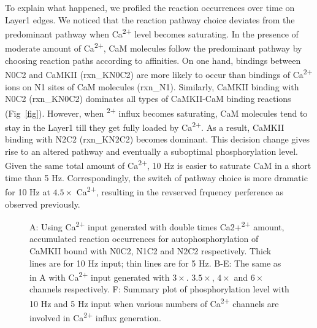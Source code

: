 \documentclass[10pt,letterpaper]{article}
\begin{document}
To explain what happened, we profiled the reaction occurrences over time on Layer1 edges. We noticed that the reaction pathway choice deviates from the predominant pathway when Ca\textsuperscript{2+} level becomes saturating. In the presence of moderate amount of Ca\textsuperscript{2+}, CaM molecules follow the predominant pathway by choosing reaction paths according to affinities. On one hand, bindings between N0C2 and CaMKII (rxn_KN0C2) are more likely to occur than bindings of Ca\textsuperscript{2+} ions on N1 sites of CaM molecules (rxn_N1). Similarly, CaMKII binding with N0C2 (rxn_KN0C2) dominates all types of CaMKII-CaM binding reactions (Fig~\ref{fig}). However, when \textsuperscript{2+} influx becomes saturating, CaM molecules tend to stay in the Layer1 till they get fully loaded by Ca\textsuperscript{2+}. As a result, CaMKII binding with N2C2 (rxn_KN2C2) becomes dominant. This decision change gives rise to an altered pathway and eventually a suboptimal phosphorylation level. Given the same total amount of Ca\textsuperscript{2+}, 10 Hz is easier to saturate CaM in a short time than 5 Hz. Correspondingly, the switch of pathway choice is more dramatic for 10 Hz at $4.5\times$ Ca\textsuperscript{2+}, resulting in the revserved frquency perference as observed previously.

\begin{figure}[!h]
	\caption{{\bf}
	A: Using Ca\textsuperscript{2+} input generated with double times Ca2+\textsuperscript{2+} amount, accumulated reaction occurrences for autophosphorylation of CaMKII bound with N0C2, N1C2 and N2C2 respectively. Thick lines are for 10 Hz input; thin lines are for 5 Hz. B-E: The same as in A with Ca\textsuperscript{2+} input generated with $3\times$. $3.5\times$, $4\times$ and $6\times$ channels respectively. F: Summary plot of phosphorylation level with 10 Hz and 5 Hz input when various numbers of Ca\textsuperscript{2+} channels are involved in Ca\textsuperscript{2+} influx generation.}
\label{fig5}
\end{figure}
\end{document}
